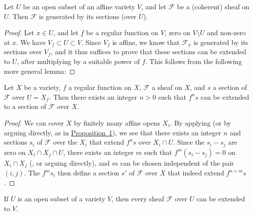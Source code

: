 \documentclass{article}
\theoremstyle{plain}
\newenvironment{proposition}[1]
    {\renewcommand\theinnerproposition{#1}\innerproposition}
    {\endinnerproposition}
\newenvironment{lemma}[1]
    {\renewcommand\theinnerlemma{#1}\innerlemma}
    {\endinnerlemma}
\theoremstyle{definition}
\newcommand{\scr}[1]{{\mathscr{#1}}}
\newcommand{\oldpage}[1]{\marginpar{\footnotesize$\Big\vert$ \textit{p.~#1}}}
\begin{document}
\begin{lemma}{1}
\label{lemma1}
  Let $U$ be an open subset of an affine variety $V$, and let $\scr{F}$ be a (coherent) sheaf on $U$.
  Then $\scr{F}$ is generated by its sections (over $U$).
\end{lemma}

\begin{proof}
  Let $x\in U$, and let $f$ be a regular function on $V$, zero on $V\setminus U$ and non-zero at $x$.
  We have $V_f\subset U\subset V$.
  Since $V_f$ is affine, we know \cite{12} that $\scr{F}_x$ is generated by its sections over $V_f$, and it thus suffices to prove that these sections can be extended to $U$, after multiplying by a suitable power of $f$.
  This follows from the following more general lemma:
\end{proof}

\begin{lemma}{2}
\label{lemma2}
  Let $X$ be a variety, $f$ a regular function on $X$, $\scr{F}$ a sheaf on $X$, and $s$ a section of $\scr{F}$ over $U=X_f$.
  Then there exists an integer $n>0$ such that $f^ns$ can be extended to a section of $\scr{F}$ over $X$.
\end{lemma}

\begin{proof}
  We can cover $X$ by finitely many affine opens $X_i$.
  By applying \cite[lemma~1, p.~247]{12} (or by arguing directly, as in \hyperref[proposition1]{Proposition~1}), we see that there exists an integer $n$ and sections $s_i$ of $\scr{F}$ over the $X_i$ that extend $f^ns$ over $X_i\cap U$.
  Since the $s_i-s_j$ are zero on $X_i\cap X_j\cap U$, there exists an integer $m$ such that $f^m(s_i-s_j)=0$ on $X_i\cap X_j$ (\cite[p.~235]{12}, or arguing directly), and $m$ can be chosen independent of the pair $(i,j)$.
  The $f^ms_i$ then define a section $s'$ of $\scr{F}$ over $X$ that indeed extend $f^{n+m}s$.
\end{proof}

\begin{proposition}{2}
\label{proposition2}
\oldpage{99}
  If $U$ is an open subset of a variety $V$, then every sheaf $\scr{F}$ over $U$ can be extended to $V$.
\end{proposition}
\end{document}
